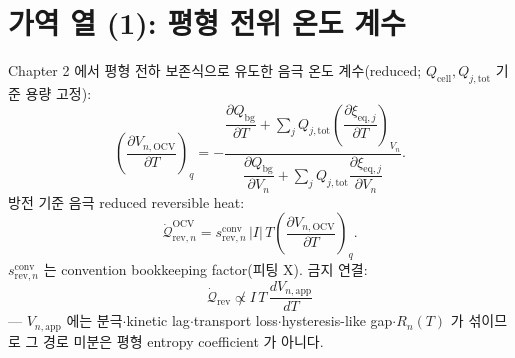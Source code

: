 \documentclass[11pt,a4paper]{article}
\newcommand{\eq}{\mathrm{eq}}
\newcommand{\app}{\mathrm{app}}
\newcommand{\tot}{\mathrm{tot}}
\newcommand{\bg}{\mathrm{bg}}
\newcommand{\cell}{\mathrm{cell}}
\newcommand{\OCV}{\mathrm{OCV}}
\newcommand{\rev}{\mathrm{rev}}
\newcommand{\conv}{\mathrm{conv}}
\begin{document}
\section{가역 열 (1): 평형 전위 온도 계수}\label{sec:ch4_revOCV}
Chapter 2 에서 평형 전하 보존식으로 유도한 음극 온도 계수(reduced; $Q_\cell,Q_{j,\tot}$ 기준 용량 고정):
\begin{equation}
\left(\frac{\partial V_{n,\OCV}}{\partial T}\right)_q
=-\frac{\dfrac{\partial Q_\bg}{\partial T}+\sum_jQ_{j,\tot}\left(\dfrac{\partial\xi_{\eq,j}}{\partial T}\right)_{V_n}}
{\dfrac{\partial Q_\bg}{\partial V_n}+\sum_jQ_{j,\tot}\dfrac{\partial\xi_{\eq,j}}{\partial V_n}}.
\label{eq:ch4_ocv_dvdt}
\end{equation}
방전 기준 음극 reduced reversible heat:
\begin{equation}
\dot{\mathcal Q}_{\rev,n}^{\OCV}=s_{\rev,n}^{\conv}\,|I|\,T\left(\frac{\partial V_{n,\OCV}}{\partial T}\right)_q.
\label{eq:ch4_rev_ocv}
\end{equation}
$s_{\rev,n}^{\conv}$ 는 convention bookkeeping factor(피팅 X). 금지 연결:
\begin{equation}
\dot{\mathcal Q}_{\rev}\not\propto I\,T\,\frac{dV_{n,\app}}{dT}
\label{eq:ch4_forbid}
\end{equation}
— $V_{n,\app}$ 에는 분극$\cdot$kinetic lag$\cdot$transport loss$\cdot$hysteresis-like gap$\cdot R_n(T)$ 가
섞이므로 그 경로 미분은 평형 entropy coefficient 가 아니다.

\end{document}
